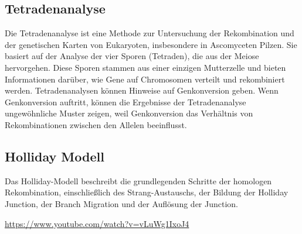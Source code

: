 \documentclass{article}
\begin{document}
\subsection*{Tetradenanalyse}
Die Tetradenanalyse ist eine Methode zur Untersuchung der Rekombination und der genetischen Karten von Eukaryoten, insbesondere in Ascomyceten Pilzen. Sie basiert auf der Analyse der vier Sporen (Tetraden), die aus der Meiose hervorgehen. Diese Sporen stammen aus einer einzigen Mutterzelle und bieten Informationen darüber, wie Gene auf Chromosomen verteilt und rekombiniert werden. \newline
Tetradenanalysen können Hinweise auf Genkonversion geben. Wenn Genkonversion auftritt, können die Ergebnisse der Tetradenanalyse ungewöhnliche Muster zeigen, weil Genkonversion das Verhältnis von Rekombinationen zwischen den Allelen beeinflusst.
\subsection*{Holliday Modell} 
Das Holliday-Modell beschreibt die grundlegenden Schritte der homologen Rekombination, einschließlich des Strang-Austauschs, der Bildung der Holliday Junction, der Branch Migration und der Auflösung der Junction. 

\url{https://www.youtube.com/watch?v=vLuWg1IxoJ4}
\end{document}
